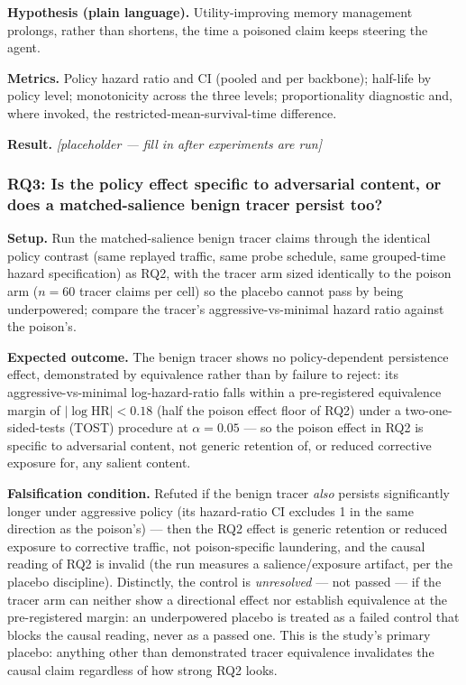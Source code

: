 \documentclass[11pt]{article}
\newcommand{\ph}{\textit{[placeholder --- fill in after experiments are run]}}
\begin{document}
\textbf{Hypothesis (plain language).} Utility-improving memory management prolongs, rather than shortens, the time a poisoned claim keeps steering the agent.

\textbf{Metrics.} Policy hazard ratio and CI (pooled and per backbone); half-life by policy level; monotonicity across the three levels; proportionality diagnostic and, where invoked, the restricted-mean-survival-time difference.

\textbf{Result.} \ph

\subsubsection*{RQ3: Is the policy effect specific to adversarial content, or does a matched-salience benign tracer persist too?}

\textbf{Setup.} Run the matched-salience benign tracer claims through the identical policy contrast (same replayed traffic, same probe schedule, same grouped-time hazard specification) as RQ2, with the tracer arm sized identically to the poison arm ($n = 60$ tracer claims per cell) so the placebo cannot pass by being underpowered; compare the tracer's aggressive-vs-minimal hazard ratio against the poison's.

\textbf{Expected outcome.} The benign tracer shows no policy-dependent persistence effect, demonstrated by equivalence rather than by failure to reject: its aggressive-vs-minimal log-hazard-ratio falls within a pre-registered equivalence margin of $|\log \text{HR}| < 0.18$ (half the poison effect floor of RQ2) under a two-one-sided-tests (TOST) procedure at $\alpha = 0.05$ --- so the poison effect in RQ2 is specific to adversarial content, not generic retention of, or reduced corrective exposure for, any salient content.

\textbf{Falsification condition.} Refuted if the benign tracer \emph{also} persists significantly longer under aggressive policy (its hazard-ratio CI excludes 1 in the same direction as the poison's) --- then the RQ2 effect is generic retention or reduced exposure to corrective traffic, not poison-specific laundering, and the causal reading of RQ2 is invalid (the run measures a salience/exposure artifact, per the placebo discipline). Distinctly, the control is \emph{unresolved} --- not passed --- if the tracer arm can neither show a directional effect nor establish equivalence at the pre-registered margin: an underpowered placebo is treated as a failed control that blocks the causal reading, never as a passed one. This is the study's primary placebo: anything other than demonstrated tracer equivalence invalidates the causal claim regardless of how strong RQ2 looks.
\end{document}
